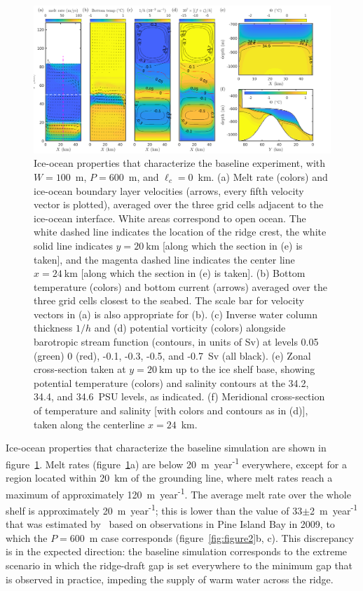 \documentclass[draft]{agujournal2019}
\begin{document}
\begin{figure}
    \centering
    \includegraphics[width = \textwidth]{../make_figures/plots/figure3.png}
    \caption{Ice-ocean properties that characterize the baseline experiment, with $W = 100$~m, $P = 600$~m, and $\ell_c = 0$~km. (a) Melt rate (colors) and ice-ocean boundary layer velocities (arrows, every fifth velocity vector is plotted), averaged over the three grid cells adjacent to the ice-ocean interface. White areas correspond to open ocean. The white dashed line indicates the location of the ridge crest, the white solid line indicates $y=20~\text{km}$ [along which the section in (e) is taken], and the magenta dashed line indicates the center line $x = 24~\text{km}$ [along which the section in (e) is taken]. (b) Bottom temperature (colors) and bottom current (arrows) averaged over the three grid cells closest to the seabed. The scale bar for velocity vectors in (a) is also appropriate for (b). (c) Inverse water column thickness $1/h$  and (d) potential vorticity (colors) alongside barotropic stream function (contours, in units of Sv) at levels 0.05 (green) 0 (red), -0.1, -0.3, -0.5, and -0.7~Sv (all black). (e) Zonal cross-section taken at $y=20~\text{km}$ up to the ice shelf base, showing potential temperature (colors) and salinity contours at the 34.2, 34.4, and 34.6~PSU levels, as indicated. (f) Meridional cross-section of temperature and salinity [with colors and contours as in (d)], taken along the centerline $x = 24$~km.}
    \label{fig:figure3}
\end{figure}

Ice-ocean properties that characterize the baseline simulation are shown in figure~\ref{fig:figure3}. Melt rates (figure~\ref{fig:figure3}a) are below  20~m~year\textsuperscript{-1} everywhere, except for a region located within 20~km of the grounding line, where melt rates reach a maximum of approximately 120~m~year\textsuperscript{-1}. The average melt rate over the whole shelf is approximately 20~m~year\textsuperscript{-1}; this is lower than the value of 33$\pm$2~m~year\textsuperscript{-1} that was estimated by~ based on observations in Pine Island Bay in 2009, to which the $P=600$~m case corresponds (figure~\ref{fig:figure2}b, c). This discrepancy is in the expected direction: the baseline simulation corresponds to the extreme scenario in which the ridge-draft gap is set everywhere to the minimum gap that is observed in practice, impeding the supply of warm water across the ridge.
\end{document}
